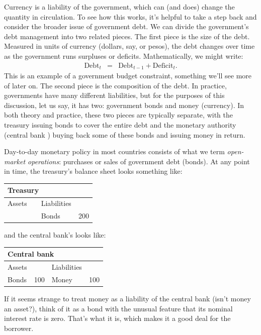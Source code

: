 Currency is a liability of the government,
which can (and does) change the quantity in circulation.
To see how this works, it's helpful to take a
step back and consider the broader issue of government debt.
We can divide the government's debt management into two
related pieces.
The first piece is the size of the debt.
Measured in units of currency (dollars, say, or pesos),
the debt changes over time as the government runs surpluses
or deficits.
Mathematically, we might write:
\begin{eqnarray*}
    \mbox{Debt}_{t} &=& \mbox{Debt}_{t-1} + \mbox{Deficit}_t .
\end{eqnarray*}
This is an example of a government budget constraint, something
we'll see more of later on.
The second piece is the composition of the debt.
In practice, governments have many different liabilities,
but for the purposes of this discussion, let us say, it has two:
government bonds  and money (currency).
In both theory and practice,
these two pieces are typically separate,
with the treasury issuing bonds  to cover the entire debt
and the monetary authority (central bank ) buying back
some of these bonds  and issuing money in return.

Day-to-day monetary policy in most countries consists of what we term
{\it open-market operations\/}:  purchases or sales of
government debt (bonds).
At any point in time, the treasury's balance sheet looks
something like:
%
\begin{center}
\begin{tabular}{lr|lr}
\multicolumn{4}{l}{Treasury} \\
\hline
Assets\phantom{ities}  &\phantom{100}&  Liabilities \\
\hline
& & Bonds & 200
\end{tabular}
\end{center}
%
and the central bank's  looks like:
%
\begin{center}
\begin{tabular}{lr|lr}
\multicolumn{4}{l}{Central bank} \\
\hline
Assets\phantom{ities}  &&  Liabilities \\
\hline
Bonds &  100 & Money & 100
\end{tabular}
\end{center}
%
If it seems strange to treat money as a liability of the
central bank (isn't money an asset?),
think of it as a bond  with the unusual
feature that its nominal interest rate is zero.
That's what it is, which makes it a good deal for the borrower.

